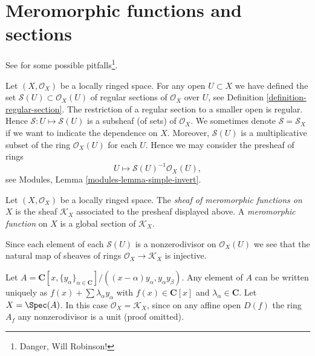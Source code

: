










\section{Meromorphic functions and sections}
\label{section-meromorphic-functions}

\noindent
See \cite{misconceptions} for some possible
pitfalls\footnote{Danger, Will Robinson!}.

\medskip\noindent
Let $(X, \mathcal{O}_X)$ be a locally ringed space.
For any open $U \subset X$ we have defined the set
$\mathcal{S}(U) \subset \mathcal{O}_X(U)$
of regular sections of $\mathcal{O}_X$ over $U$, see
Definition \ref{definition-regular-section}. The restriction
of a regular section to a smaller open is regular. Hence
$\mathcal{S} : U \mapsto \mathcal{S}(U)$ is a subsheaf (of sets)
of $\mathcal{O}_X$. We sometimes denote $\mathcal{S} = \mathcal{S}_X$
if we want to indicate the dependence on $X$.
Moreover, $\mathcal{S}(U)$
is a multiplicative subset of the ring $\mathcal{O}_X(U)$ for
each $U$. Hence we may consider
the presheaf of rings
$$
U \longmapsto \mathcal{S}(U)^{-1} \mathcal{O}_X(U),
$$
see Modules, Lemma \ref{modules-lemma-simple-invert}.

\begin{definition}
\label{definition-sheaf-meromorphic-functions}
Let $(X, \mathcal{O}_X)$ be a locally ringed space.
The {\it sheaf of meromorphic functions on $X$} is
the sheaf {\it $\mathcal{K}_X$} associated to the presheaf
displayed above. A {\it meromorphic function} on $X$
is a global section of $\mathcal{K}_X$.
\end{definition}

\noindent
Since each element of each $\mathcal{S}(U)$ is a nonzerodivisor on
$\mathcal{O}_X(U)$ we see that the natural map of sheaves
of rings $\mathcal{O}_X \to \mathcal{K}_X$ is injective.

\begin{example}
\label{example-no-change}
Let $A = \mathbf{C}[x, \{y_\alpha\}_{\alpha \in \mathbf{C}}]/
((x - \alpha)y_\alpha, y_\alpha y_\beta)$. Any element of $A$
can be written uniquely as
$f(x) + \sum \lambda_\alpha y_\alpha$ with $f(x) \in \mathbf{C}[x]$
and $\lambda_\alpha \in \mathbf{C}$.
Let $X = \Spec(A)$.
In this case $\mathcal{O}_X = \mathcal{K}_X$, since on
any affine open $D(f)$ the ring $A_f$ any nonzerodivisor is
a unit (proof omitted).
\end{example}

